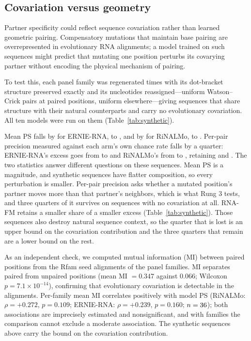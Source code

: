 \documentclass[11pt]{article}
\begin{document}
\subsection{Covariation versus geometry}
\label{sec:covariation-results}

Partner specificity could reflect sequence covariation rather than
learned geometric pairing. Compensatory mutations that maintain base
pairing are overrepresented in evolutionary RNA alignments; a model
trained on such sequences might predict that mutating one position
perturbs its covarying partner without encoding the physical mechanism
of pairing.

To test this, each panel family was regenerated \synPerFamily{} times with its
dot-bracket structure preserved exactly and its nucleotides reassigned---uniform
Watson--Crick pairs at paired positions, uniform elsewhere---giving \synN{}
sequences that share structure with their natural counterparts and carry no
evolutionary covariation. All ten models were run on them
(Table~\ref{tab:synthetic}).



Mean PS falls by \synPSDropErnieRNA{} for ERNIE-RNA, to \synPSErnieRNA{}, and
by \synPSDropRiNALMo{} for RiNALMo, to \synPSRiNALMo{}. Per-pair precision
measured against each arm's own chance rate falls by a quarter: ERNIE-RNA's
excess goes from \natExcessErnieRNA{} to \synExcessErnieRNA{} and RiNALMo's
from \natExcessRiNALMo{} to \synExcessRiNALMo{}, retaining
\synRetainedErnieRNA{} and \synRetainedRiNALMo{}. The two statistics answer
different questions on these sequences. Mean PS is a magnitude, and synthetic
sequences have flatter composition, so every perturbation is smaller. Per-pair
precision asks whether a mutated position's partner moves more than that
partner's neighbors, which is what Rung 3 tests, and three quarters of it
survives on sequences with no covariation at all. RNA-FM retains a smaller
share of a smaller excess (Table~\ref{tab:synthetic}). Those sequences also destroy
natural sequence context, so the quarter that is lost is an upper bound on the
covariation contribution and the three quarters that remain are a lower bound
on the rest.

As an independent check, we computed mutual information (MI) between
paired positions from the Rfam seed alignments of the \panelN{} panel families.
MI separates paired from unpaired positions (mean MI $= 0.347$ against
$0.066$; Wilcoxon $p = 7.1 \times 10^{-14}$), confirming that evolutionary
covariation is detectable in the alignments. Per-family mean MI correlates
positively with model PS (RiNALMo: $\rho = +0.272$, $p = 0.109$;
ERNIE-RNA: $\rho = +0.239$, $p = 0.160$; $n = 36{}$); both associations are imprecisely estimated and nonsignificant, and with
\confirmatoryN{} families the comparison cannot exclude a moderate association.
The synthetic sequences above carry the bound on the covariation contribution.
\end{document}
